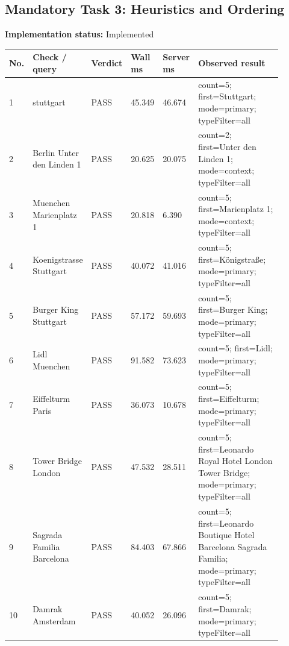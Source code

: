 \documentclass[10pt,a4paper]{article}
\begin{document}
\subsection{Mandatory Task 3: Heuristics and Ordering}
\textbf{Implementation status:} Implemented\\
\scriptsize
\begin{longtable}{|P{0.045\linewidth}|P{0.19\linewidth}|P{0.105\linewidth}|P{0.085\linewidth}|P{0.085\linewidth}|P{0.385\linewidth}|}
\hline
\textbf{No.} & \textbf{Check / query} & \textbf{Verdict} & \textbf{Wall ms} & \textbf{Server ms} & \textbf{Observed result}\\ \hline
{} 1 & stuttgart & PASS & 45.349 & 46.674 & count=5; first=Stuttgart; mode=primary; typeFilter=all\\ \hline
{} 2 & Berlin Unter den Linden 1 & PASS & 20.625 & 20.075 & count=2; first=Unter den Linden 1; mode=context; typeFilter=all\\ \hline
{} 3 & Muenchen Marienplatz 1 & PASS & 20.818 & 6.390 & count=5; first=Marienplatz 1; mode=context; typeFilter=all\\ \hline
{} 4 & Koenigstrasse Stuttgart & PASS & 40.072 & 41.016 & count=5; first=Königstraße; mode=primary; typeFilter=all\\ \hline
{} 5 & Burger King Stuttgart & PASS & 57.172 & 59.693 & count=5; first=Burger King; mode=primary; typeFilter=all\\ \hline
{} 6 & Lidl Muenchen & PASS & 91.582 & 73.623 & count=5; first=Lidl; mode=primary; typeFilter=all\\ \hline
{} 7 & Eiffelturm Paris & PASS & 36.073 & 10.678 & count=5; first=Eiffelturm; mode=primary; typeFilter=all\\ \hline
{} 8 & Tower Bridge London & PASS & 47.532 & 28.511 & count=5; first=Leonardo Royal Hotel London Tower Bridge; mode=primary; typeFilter=all\\ \hline
{} 9 & Sagrada Familia Barcelona & PASS & 84.403 & 67.866 & count=5; first=Leonardo Boutique Hotel Barcelona Sagrada Familia; mode=primary; typeFilter=all\\ \hline
{} 10 & Damrak Amsterdam & PASS & 40.052 & 26.096 & count=5; first=Damrak; mode=primary; typeFilter=all\\ \hline
\end{longtable}
\normalsize
\end{document}
